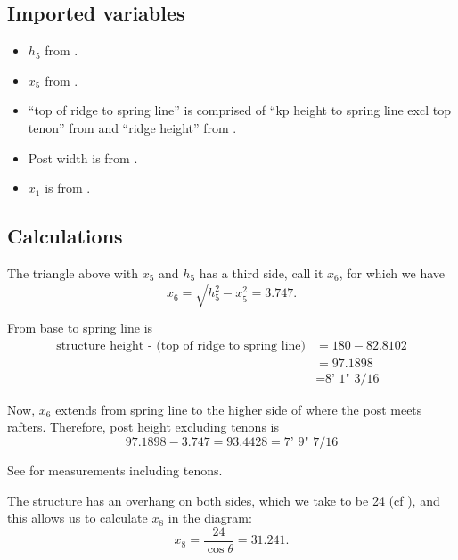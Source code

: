 \documentclass{article}\usepackage[]{graphicx}\usepackage[]{xcolor}
\begin{document}
\subsection{Imported variables} \label{posts-rafters-imported-variables}
\begin{itemize}
  \item $h_5$ from .
  \item $x_5$ from .
  \item ``top of ridge to spring line'' is comprised of ``kp height to spring line excl top tenon'' from  and ``ridge height'' from .
  \item Post width is from .
  \item $x_1$ is from .
\end{itemize}


\subsection{Calculations} \label{posts-rafters-calculations}

\begin{center}
\end{center}



The triangle above with $x_5$ and $h_5$ has a third side, call it $x_6$, for which we have 
\[ x_6 = \sqrt{h_5^2 - x_5^2} = 3.747. \]

From base to spring line is 
\begin{align*}
\text{structure height - (top of ridge to spring line)} &= 180 - 82.8102\\
&= 97.1898\\
&= \text{8' 1" 3/16}
\end{align*}

Now, $x_6$ extends from spring line to the higher side of where the post meets rafters. Therefore, post height excluding tenons is 
\[ 97.1898 - 3.747 = 93.4428 = \text{7' 9" 7/16}  \]

See  for measurements including tenons. 

The structure has an overhang on both sides, which we take to be 24 (cf ), and this allows us to calculate $x_8$ in the diagram: 
\[ x_8 = \frac{24}{\cos\theta} = 31.241. \]
\end{document}
